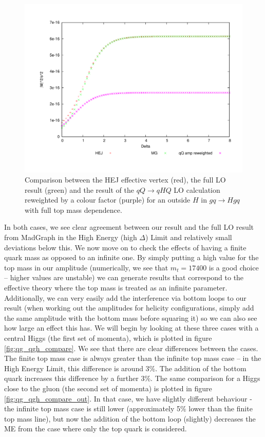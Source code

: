 \begin{figure}[t]
\centering
\includegraphics[scale=0.45]{Images/qg_qgH_outside.pdf}
\caption{Comparison between the HEJ effective vertex (red), the full LO result (green) and the result of the $qQ \to qHQ$ LO calculation reweighted by a colour factor (purple) for an outside $H$ in $gq \to Hgq$ with full top mass dependence.}
\label{fig:gu_ghu_out}
\end{figure}
In both cases, we see clear agreement between our result and the full LO result from MadGraph in the High Energy (high $\Delta$) Limit and relatively small deviations below this. We now move on to check the effects of having a finite quark mass as opposed to an infinite one. By simply putting a high value for the top mass in our amplitude (numerically, we see that $m_t = 17400$ is a good choice -- higher values are unstable) we can generate results that correspond to the effective theory where the top mass is treated as an infinite parameter. Additionally, we can very easily add the interference via bottom loops to our result (when working out the amplitudes for helicity configurations, simply add the same amplitude with the bottom mass before squaring it) so we can also see how large an effect this has. We will begin by looking at these three cases with a central Higgs (the first set of momenta), which is plotted in figure \ref{fig:qg_qgh_compare}. We see that there are clear differences between the cases. The finite top mass case is always greater than the infinite top mass case -- in the High Energy Limit, this difference is around 3\%. The addition of the bottom quark increases this difference by a further 3\%. The same comparison for a Higgs close to the gluon (the second set of momenta) is plotted in figure \ref{fig:qg_qgh_compare_out}. In that case, we have slightly different behaviour - the infinite top mass case is still lower (approximately 5\% lower than the finite top mass line), but now the addition of the bottom loop (slightly) decreases the ME from the case where only the top quark is considered. 

